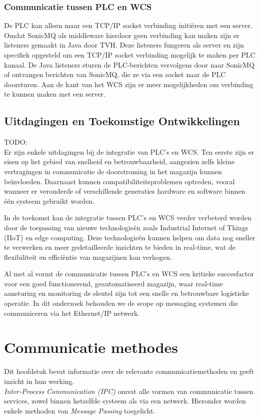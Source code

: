 \subsubsection{Communicatie tussen PLC en WCS}
De PLC kan alleen maar een TCP/IP socket verbinding initiëren met een server.
Omdat SonicMQ als middleware hierdoor geen verbinding kan maken zijn er listeners gemaakt in Java door TVH.
Deze listeners fungeren als server en zijn specifiek opgesteld om een TCP/IP socket verbinding mogelijk te maken per PLC kanaal.
De Java listeners sturen de PLC-berichten vervolgens door naar SonicMQ of ontvangen berichten van SonicMQ, 
die ze via een socket naar de PLC doorsturen.
Aan de kant van het WCS zijn er meer mogelijkheden om verbinding te kunnen maken met een server.
 
\subsection{Uitdagingen en Toekomstige Ontwikkelingen} 
TODO:
\\
Er zijn enkele uitdagingen bij de integratie van PLC’s en WCS. 
Ten eerste zijn er eisen op het gebied van snelheid en betrouwbaarheid, aangezien zelfs kleine vertragingen in communicatie de doorstroming in het magazijn kunnen beïnvloeden. 
Daarnaast kunnen compatibiliteitsproblemen optreden, vooral wanneer er verouderde of verschillende generaties hardware en software binnen één systeem gebruikt worden.

In de toekomst kan de integratie tussen PLC’s en WCS verder verbeterd worden door de toepassing van nieuwe technologieën zoals Industrial Internet of Things (IIoT) en edge computing. 
Deze technologieën kunnen helpen om data nog sneller te verwerken en meer gedetailleerde inzichten te bieden in real-time, wat de flexibiliteit en efficiëntie van magazijnen kan verhogen.

Al met al vormt de communicatie tussen PLC’s en WCS een kritieke succesfactor voor een goed functionerend, geautomatiseerd magazijn, waar real-time aansturing en monitoring de sleutel zijn tot een snelle en betrouwbare logistieke operatie.
In dit onderzoek behouden we de scope op messaging systemen die communiceren via het Ethernet/IP netwerk.

\section{Communicatie methodes}
Dit hoofdstuk bevat informatie over de relevante communicatiemethoden en geeft inzicht in hun werking.
\\
\emph{Inter-Process Communication (IPC)} omvat alle vormen van communicatie tussen services, 
zowel binnen hetzelfde systeem als via een netwerk. 
Hieronder worden enkele methoden van \emph{Message Passing} toegelicht.

